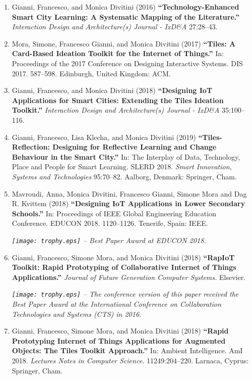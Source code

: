\begin{enumerate}[label=\numberingI{\textbf{P\arabic*}}]
    \item Gianni, Francesco, and Monica Divitini (2016) \textbf{\enquote{Technology-Enhanced Smart City Learning: A Systematic Mapping of the Literature.}} \emph{Interaction Design and Architecture(s) Journal - IxD\&A} 27:28--43.
    \item Mora, Simone, Francesco Gianni, and Monica Divitini (2017) \textbf{\enquote{Tiles: A Card-Based Ideation Toolkit for the Internet of Things.}} In: Proceedings of the 2017 Conference on Designing Interactive Systems. DIS 2017. 587--598. Edinburgh, United Kingdom: ACM.
    \item Gianni, Francesco, and Monica Divitini (2018) \textbf{\enquote{Designing IoT Applications for Smart Cities: Extending the Tiles Ideation Toolkit.}} \emph{Interaction Design and Architecture(s) Journal - IxD\&A} 35:100--116.
    \item Gianni, Francesco, Lisa Klecha, and Monica Divitini (2019) \textbf{\enquote{Tiles-Reflection: Designing for Reflective Learning and Change Behaviour in the Smart City.}} In: The Interplay of Data, Technology, Place and People for Smart Learning. SLERD 2018. \emph{Smart Innovation, Systems and Technologies} 95:70--82. Aalborg, Denmark: Springer, Cham.
    \item Mavroudi, Anna, Monica Divitini, Francesco Gianni, Simone Mora and Dag R. Kvittem (2018) \textbf{\enquote{Designing IoT Applications in Lower Secondary Schools.}} In: Proceedings of IEEE Global Engineering Education Conference. EDUCON 2018. 1120--1126. Tenerife, Spain: IEEE.
    
    {\footnotesize \textit{\texttt{[image: trophy.eps]} -- Best Paper Award at EDUCON 2018.}}
    \item Gianni, Francesco, Simone Mora, and Monica Divitini (2018) \textbf{\enquote{RapIoT Toolkit: Rapid Prototyping of Collaborative Internet of Things Applications.}} \emph{Journal of Future Generation Computer Systems.} Elsevier.
    
    {\footnotesize \textit{\texttt{[image: trophy.eps]} -- The conference version of this paper received the Best Paper Award at the International Conference on Collaboration Technologies and Systems (CTS) in 2016.}}
    \item Gianni, Francesco, Simone Mora, and Monica Divitini (2018) \textbf{\enquote{Rapid Prototyping Internet of Things Applications for Augmented Objects: The Tiles Toolkit Approach.}} In: Ambient Intelligence. AmI 2018. \emph{Lectures Notes in Computer Science.} 11249:204--220. Larnaca, Cyprus: Springer, Cham.
\end{enumerate}


